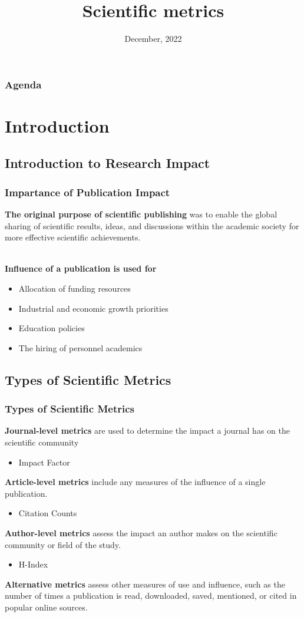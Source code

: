 \documentclass{beamer}
\title{Scientific metrics}
\author[O. Shkalikov \and M. Zannini \and Q. Qaribiyan]
{\aut{Oleh Shkalikov}{5102818} \and
 \aut{Matteo Zannini}{5122402} \and
 \aut{Qader Qaribiyan}{5128979}}
\institute[]{TU Dresden, Computer Science Faculty}
\date{December, 2022}
\begin{document}
\frame{\titlepage}

\begin{frame}
    \frametitle{Agenda}
    \tableofcontents
\end{frame}

\section{Introduction}
\subsection{Introduction to Research Impact}
\begin{frame}
    \frametitle{Impartance of Publication Impact}
    \textbf{The original purpose of scientific publishing} was to enable the global sharing of scientific results, ideas, and discussions within the academic society for more effective scientific achievements.\\~\

    \textbf{Influence of a publication is used for}
    \begin{itemize}
        \item Allocation of funding resources
        \item Industrial and economic growth priorities
        \item Education policies
        \item The hiring of personnel academics
    \end{itemize}
\end{frame}

\subsection{Types of Scientific Metrics }
\begin{frame}
    \frametitle{Types of Scientific Metrics }
    \textbf{Journal-level metrics} are used to determine the impact a journal has on the scientific community
    \begin{itemize}
        \item Impact Factor
    \end{itemize}
    \textbf{Article-level metrics} include any measures of the influence of a single publication.
    \begin{itemize}
        \item Citation Counts
    \end{itemize}
    \textbf{Author-level metrics} assess the impact an author makes on the scientific community or field of the study.
    \begin{itemize}
        \item H-Index
    \end{itemize}
    \textbf{Alternative metrics} assess other measures of use and influence, such as the number of times a publication is read, downloaded, saved, mentioned, or cited in popular online sources.
\end{frame}
\end{document}
